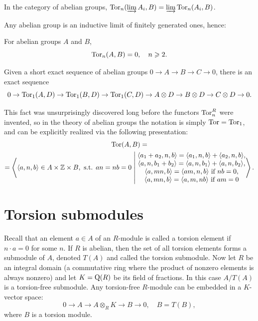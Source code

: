 \begin{thm} In the category of abelian groups,
    $\operatorname{Tor}_n(\varinjlim A_i,B)=\varinjlim \operatorname{Tor}_n(A_i,B)$.
\end{thm}
Any abelian group is an inductive limit of finitely generated ones, hence:
\begin{cor}
    For abelian groups $A$ and $B$,
    \[\operatorname{Tor}_n(A,B)=0,\quad n\geqslant 2.\]
\end{cor}
\begin{cor}
    Given a short exact sequence of abelian groups $0\to A\to B\to C\to 0$, there is an exact sequence
    \[0\to\operatorname{Tor}_1(A,D)\to \operatorname{Tor}_1(B,D)\to \operatorname{Tor}_1(C,D)\to A\otimes D\to B\otimes D\to C\otimes D\to 0.\]
\end{cor}

This fact was unsurprisingly discovered long before the functors $\operatorname{Tor}_n^R$ were invented, so in the theory of abelian groups the notation is simply $\operatorname{Tor}=\operatorname{Tor}_1$, and can be explicitly realized via the following presentation:
\begin{multline}
    \Tor(A,B)=\\
    =\left\langle \langle a,n,b\rangle\in A\times \bbZ\times B,\text{ s.t. } an=nb=0 
    \middle|
    \begin{matrix}
    \langle a_1+a_2,n,b\rangle= \langle a_1,n,b\rangle+\langle a_2,n,b\rangle,\\
    \langle a,n,b_1+b_2\rangle=\langle a,n,b_1\rangle+\langle a,n,b_2\rangle,\\
    \langle a,mn,b\rangle=\langle am,n,b\rangle \text{ if }nb=0,\\
    \langle a,mn,b\rangle=\langle a,m,nb\rangle \text{ if }am=0
    \end{matrix}
    \right\rangle.
\end{multline}




\section{Torsion submodules}

Recall that an element $a\in A$ of an $R$-module is called a torsion element if $n\cdot a=0$ for some $n$. If $R$ is abelian, then the set of all torsion elements forms a submodule of $A$, denoted $T(A)$ and called the torsion submodule. Now let $R$ be an integral domain (a commutative ring where the product of nonzero elements is always nonzero) and let $K=\mathrm{Q}(R)$ be its field of fractions. In this case $A\slash T(A)$ is a torsion-free submodule. Any torsion-free $R$-module can be embedded in a $K$-vector space:
\[0\to A\to A\otimes_R K\to B\to 0,\quad B=T(B),\]
where $B$ is a torsion module.

